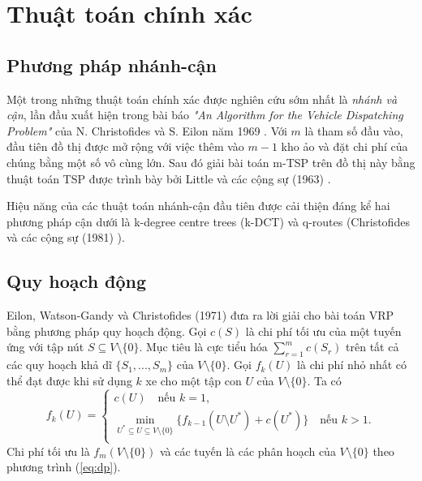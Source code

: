\section{Thuật toán chính xác}

\subsection{Phương pháp nhánh-cận}

Một trong những thuật toán chính xác được nghiên cứu sớm nhất là \textit{nhánh và cận}, lần đầu xuất hiện trong bài báo \textit{"An Algorithm for the Vehicle Dispatching Problem"} của N. Christofides và S. Eilon năm 1969 \cite{christofides1969algorithm}. Với $m$ là tham số đầu vào, đầu tiên đồ thị được mở rộng với việc thêm vào $m-1$ kho ảo và đặt chi phí của chúng bằng một số vô cùng lớn. Sau đó giải bài toán m-TSP trên đồ thị này bằng thuật toán TSP được trình bày bởi Little và các cộng sự (1963) \cite{little1963algorithm}.

Hiệu năng của các thuật toán nhánh-cận đầu tiên được cải thiện đáng kể hai phương pháp cận dưới là k-degree centre trees (k-DCT) và q-routes (Christofides và các cộng sự (1981) \cite{christofides1981exact}).

\subsection{Quy hoạch động}

Eilon, Watson-Gandy và Christofides (1971) \cite{christofides1969algorithm} đưa ra lời giải cho bài toán VRP bằng phương pháp quy hoạch động. Gọi $c(S)$ là chi phí tối ưu của một tuyến ứng với tập nút $S \subseteq V \setminus \{0\}$. Mục tiêu là cực tiểu hóa $\sum_{r=1}^{m} c(S_r)$ trên tất cả các quy hoạch khả dĩ $\{S_1,...,S_m\}$ của $V \setminus \{0\}$. Gọi $f_k(U)$ là chi phí nhỏ nhất có thể đạt được khi sử dụng $k$ xe cho một tập con $U$ của $V \setminus \{0\}$. Ta có
\begin{equation}
	\label{eq:dp}
	f_k(U) =
	\begin{cases}
		c(U) \quad \text{nếu } k = 1,                                                                                      \\
		\min_{U^* \subseteq U \subseteq V \setminus \{0\}} \{f_{k-1} (U \setminus U^*) + c(U^*)\} \quad \text{nếu } k > 1. \\
	\end{cases}
\end{equation}
Chi phí tối ưu là $f_m(V \setminus \{0\})$ và các tuyến là các phân hoạch của $V \setminus \{0\}$ theo phương trình (\ref{eq:dp}).

